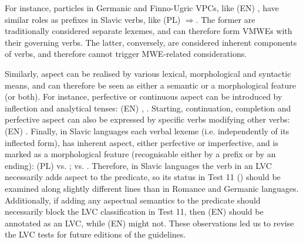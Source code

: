 \documentclass[output=paper,
modfonts,
]{langscibook}
\begin{document}
For instance, particles in Germanic and Finno-Ugric VPCs, like (EN) , have similar roles as prefixes in Slavic verbs, like (PL)  $\Rightarrow$. The former are traditionally considered separate lexemes, and can therefore form VMWEs with their governing verbs. The latter, conversely, are considered inherent components of verbs, and therefore cannot trigger MWE-related considerations.

Similarly, aspect can be realised by various lexical, morphological and syntactic means, and can therefore be seen as either a semantic or a morphological feature (or both). For instance, perfective or continuous aspect can be introduced by inflection and analytical tenses: (EN) , . Starting, continuation, completion and perfective aspect can also be expressed by specific verbs modifying other verbs: (EN) . Finally, in Slavic languages each verbal lexeme (i.e. independently of its inflected form), has inherent aspect, either perfective or imperfective, and is marked as a morphological feature (recognisable either by a prefix or by an ending): (PL) 
  vs. ;
 vs. . 
Therefore, in Slavic languages the verb in an LVC necessarily adds aspect to the predicate, so its status in Test 11 () should be examined along slightly different lines than in Romance and Germanic languages. Additionally, if adding any aspectual semantics to the predicate should necessarily block the LVC classification in Test 11, then (EN)  should be annotated as an LVC, while (EN)  might not. These observations led us to revise the LVC tests for future editions of the guidelines.
\end{document}
